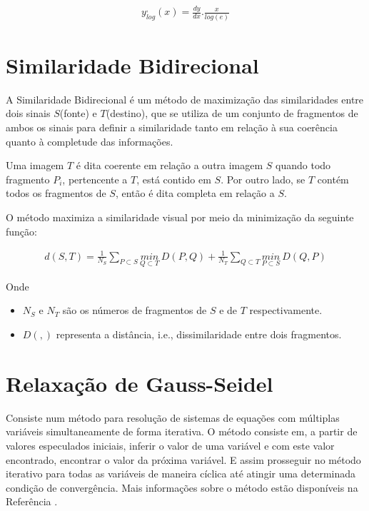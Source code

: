 \begin{align} \label{eqConceitoLog1}
          y^,_{log}(x) = \frac{dy}{dx}.\frac{x}{log(e)}
\end{align}

\section{Similaridade Bidirecional} \label{conceitoSimilaridadeBidirecional}
	A Similaridade Bidirecional \cite{simakov} é um método de maximização das similaridades entre dois sinais $S$(fonte) e $T$(destino), que se utiliza de um conjunto de fragmentos de ambos os sinais para definir a similaridade tanto em relação à sua coerência quanto à completude das informações.
	
	Uma imagem $T$ é dita coerente em relação a outra imagem $S$ quando todo fragmento $P_i$, pertencente a $T$, está contido em $S$. Por outro lado, se $T$ contém todos os fragmentos de $S$, então é dita completa em relação a $S$.
	
	O método maximiza a similaridade visual por meio da minimização da seguinte função:
	
\begin{align} \label{eqConceitoSimilaridade}
          d(S,T) = \frac{1}{N_S}\sum\limits_{P \subset S}{\underset{Q \subset T}{min}~D(P,Q)} + \frac{1}{N_T}\sum\limits_{Q \subset T}{\underset{P \subset S}{min}~D(Q,P)}
\end{align}

Onde
\begin{itemize}
	\item $N_S$ e $N_T$ são os números de fragmentos de $S$ e de $T$ respectivamente.
	\item $D(,)$ representa a distância, i.e., dissimilaridade entre dois fragmentos. 
\end{itemize} 
	

 \section{Relaxação de Gauss-Seidel} \label{conceitoGauss-Seidel}
	Consiste num método para resolução de sistemas de equações com múltiplas variáveis simultaneamente de forma iterativa. O método consiste em, a partir de valores especulados iniciais, inferir o valor de uma variável e com este valor encontrado, encontrar o valor da próxima variável. E assim prosseguir no método iterativo para todas as variáveis de maneira cíclica até atingir uma determinada condição de convergência. Mais informações sobre o método estão disponíveis na Referência \cite{livroCalculoNumerico}.
	

